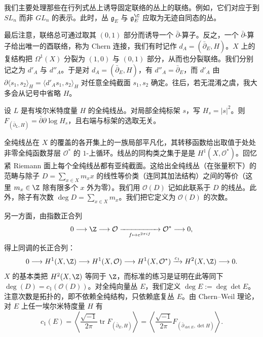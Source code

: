 \begin{remark}
我们主要处理那些在行列式丛上诱导固定联络的丛上的联络。例如，它们对应于到 $SL_n$ 而非 $GL_n$ 的表示。此时，丛 $\mathfrak{g}_E$ 与 $\mathfrak{g}^\C_E$ 应取为无迹自同态的丛。
\end{remark}

最后注意，联络总可通过取其 $(0,1)$ 部分而诱导一个 $\bar\partial$-算子。反之，一个 $\bar\partial$-算子给出唯一的酉联络，称为 Chern 连接，我们有时记作 $d_A=(\bar\partial_E,H)$。$X$ 上的复结构把 $\Omega^1(X)$ 分裂为 $(1,0)$ 与 $(0,1)$ 部分，从而也分裂联络。我们分别记之为 $d'_A$ 与 $d''_A$。于是对 $d_A=(\bar\partial_E,H)$，有 $d''_A=\bar\partial_E$，而 $d'_A$ 由 $\partial\langle s_1,s_2\rangle_H=\langle d'_As_1,s_2\rangle_H$ 对任意全纯截面 $s_1,s_2$ 确定。往后，若无混淆之虞，我大多会从记号中省略 $H$。

\begin{example}
设 $L$ 是有埃尔米特度量 $H$ 的全纯线丛。对局部全纯标架 $s$，写 $H_s=|s|^2$。则 $F_{(\bar\partial_L,H)}=\bar\partial\partial\log H_s$，且右端与标架的选取无关。
\end{example}

全纯线丛在 $X$ 的覆盖的各开集上的一族局部平凡化，其转移函数给出取值于处处非零全纯函数芽层 $\mathcal{O}^*$ 的 $1$-上循环。线丛的同构类之集于是是 $H^1(X,\mathcal{O}^*)$。回忆紧 Riemann 面上每个全纯线丛都有亚纯截面。这给出全纯线丛（在张量积下）的范畴与除子 $D=\sum_{x\in X}m_xx$ 的线性等价类（连同其加法结构）之间的等价（这里 $m_x\in\Z$ 除有限多个 $x$ 外为零）。我们用 $\mathcal{O}(D)$ 记如此联系于 $D$ 的线丛。此外，除子有次数 $\deg D=\sum_{x\in X}m_x$。我们把它定义为 $\mathcal{O}(D)$ 的次数。

另一方面，由指数正合列
\[
0\longrightarrow\Z\longrightarrow\mathcal{O}\xrightarrow[\quad f\mapsto e^{2\pi if}\quad]{}\mathcal{O}^*\longrightarrow0,
\]
得上同调的长正合列：
\[
0\longrightarrow H^1(X,\Z)\longrightarrow H^1(X,\mathcal{O})\longrightarrow H^1(X,\mathcal{O}^*)\xrightarrow{c_1}H^2(X,\Z)\longrightarrow0.
\]
$X$ 的基本类把 $H^2(X,\Z)$ 等同于 $\Z$，而标准的练习是证明在此等同下 $\deg(D)=c_1(\mathcal{O}(D))$。对全纯向量丛 $E$，我们定义 $\deg E:=\deg\det E$。注意次数是拓扑的，即不依赖全纯结构，只依赖底复丛 $E$。由 Chern--Weil 理论，对 $E$ 上任一埃尔米特度量 $H$ 有
\begin{equation}
c_1(E)=\left\langle\frac{\sqrt{-1}}{2\pi}\operatorname{tr}F_{(\bar\partial_E,H)}\right\rangle=\left\langle\frac{\sqrt{-1}}{2\pi}F_{(\bar\partial_{\det E},\det H)}\right\rangle .
\label{eq:4.3}\tag{4.3}
\end{equation}

